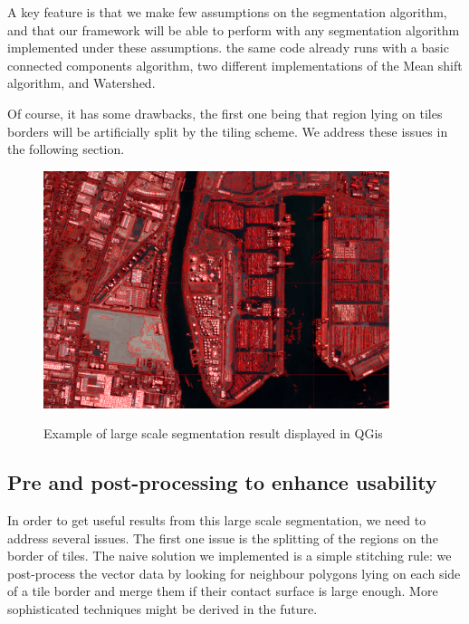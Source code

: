 \documentclass{josis}
\begin{document}
A key feature is that we make few assumptions on the segmentation
algorithm, and that our framework will be able to perform with any
segmentation algorithm implemented under these assumptions. the same
code already runs with a basic connected components algorithm, two
different implementations of the Mean shift algorithm, and Watershed.

Of course, it has some drawbacks, the first one being that region
lying on tiles borders will be artificially split by the tiling
scheme. We address these issues in the following section.

\begin{figure}[!htb]
\centering
\includegraphics[width=0.9\textwidth]{Pictures/ogrs_nostitch.png}\label{fig:nostitch}
\caption{Example of large scale segmentation result displayed in QGis}
\end{figure}


\subsection{Pre and post-processing to enhance usability}

In order to get useful results from this large scale segmentation, we
need to address several issues. The first one issue is the splitting
of the regions on the border of tiles. The naive solution we
implemented is a simple stitching rule: we post-process the vector
data by looking for neighbour polygons lying on each side of a tile
border and merge them if their contact surface is large enough. More
sophisticated techniques might be derived in the future.
\end{document}

